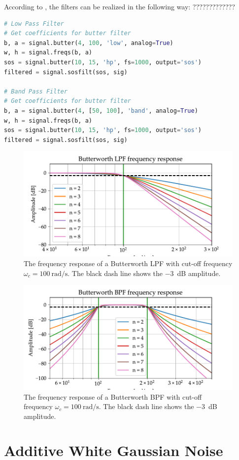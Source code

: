\documentclass[../ECE459FinalProjectReport.tex]{subfiles}
\begin{document}
According to \textcite{thescipycommunityScipySignalButter,thescipycommunityScipySignalButtera,thescipycommunityScipySignalFiltfilt,thescipycommunityScipySignalLfilter}, the filters can be realized in the following way: ?????????????
\begin{lstlisting}[language=python]
# Low Pass Filter
# Get coefficients for butter filter
b, a = signal.butter(4, 100, 'low', analog=True)
w, h = signal.freqs(b, a)
sos = signal.butter(10, 15, 'hp', fs=1000, output='sos')
filtered = signal.sosfilt(sos, sig)

# Band Pass Filter
# Get coefficients for butter filter
b, a = signal.butter(4, [50, 100], 'band', analog=True)
w, h = signal.freqs(b, a)
sos = signal.butter(10, 15, 'hp', fs=1000, output='sos')
filtered = signal.sosfilt(sos, sig)
\end{lstlisting}


\begin{figure}[b]
    \centering
    \includegraphics[scale=0.7]{plots/butterworth-lpf.pdf}
    \caption{The frequency response of a Butterworth LPF with cut-off frequency $\omega_c = \SI{100}{\radian\per\s}$. The black dash line shows the \SI{-3}{\dB} amplitude.}
    \label{fig:butter-lpf}
\end{figure}

\begin{figure}[b]
    \centering
    \includegraphics[scale=0.7]{plots/butterworth-bpf.pdf}
    \caption{The frequency response of a Butterworth BPF with cut-off frequency $\omega_c = \SI{100}{\radian\per\s}$. The black dash line shows the \SI{-3}{\dB} amplitude.}
    \label{fig:butter-bpf}
\end{figure}


\section{Additive White Gaussian Noise}
\end{document}
